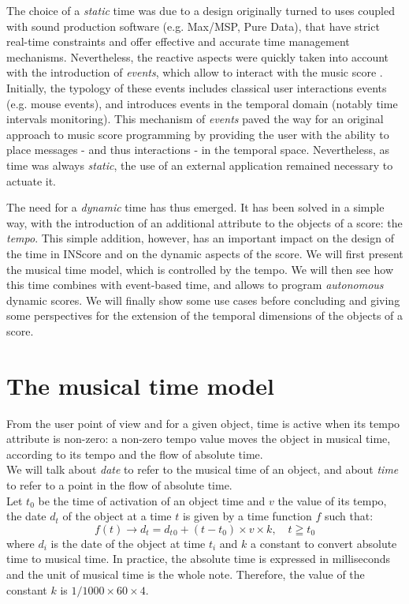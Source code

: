 \documentclass{article}
\begin{document}
The choice of a \emph{static} time was due to a design originally turned to uses coupled with sound production software (e.g. Max/MSP, Pure Data), that have strict real-time constraints and offer effective and accurate time management mechanisms. Nevertheless, the reactive aspects were quickly taken into account with the introduction of \textit{events}, which allow to interact with the music score \cite{Fober:13b}. Initially, the typology of these events includes classical user interactions events (e.g. mouse events), and introduces events in the temporal domain (notably time intervals monitoring). This mechanism of \textit{events} paved the way for an original approach to music score programming by providing the user with the ability to place messages - and thus interactions - in the temporal space. Nevertheless, as time was always \emph{static}, the use of an external application remained necessary to actuate it.

The need for a \emph{dynamic} time has thus emerged. It has been solved in a simple way, with the introduction of an additional attribute to the objects of a score: the \emph{tempo}. This simple addition, however, has an important impact on the design of the time in INScore and on the dynamic aspects of the score. We will first present the musical time model, which is controlled by the tempo. We will then see how this time combines with event-based time, and allows to program \emph{autonomous} dynamic scores. We will finally show some use cases before concluding and giving some perspectives for the extension of the temporal dimensions of the objects of a score.


\section{The musical time model}\label{mustime}

From the user point of view and for a given object, time is active when its tempo attribute is non-zero: a non-zero tempo value moves the object in musical time, according to its tempo and the flow of absolute time. \\
We will talk about \emph{date} to refer to the musical time of an object, and about \emph{time} to refer to a point in the flow of absolute time. \\

Let $t_0$ be the time of activation of an object time and $v$ the value of its tempo, the date $d_t$ of the object at a time $t$ is given by a time function $f$ such that:
\begin{equation}
	 f(t) \to d_t = d_t{_0} + (t - t_0) \times v \times k , \quad t \geqq t_0
\label{timeeq}
\end{equation}
where $d_i$ is the date of the object at time $t_i$ and $k$ a constant to convert absolute time to musical time. In practice, the absolute time is expressed in milliseconds and the unit of musical time is the whole note. Therefore, the value of the constant $k$ is $1/1000 \times 60 \times 4$.
\end{document}
